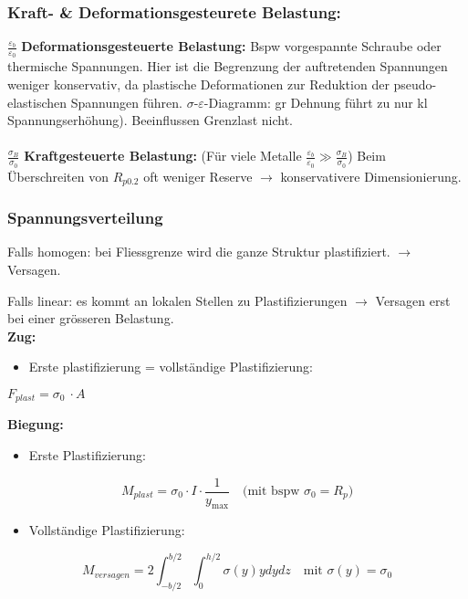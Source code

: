            \subsubsection{Kraft- \& Deformationsgesteurete Belastung:}
            $\frac{\varepsilon_b}{\varepsilon_0}$ \textbf{Deformationsgesteuerte Belastung:} Bspw vorgespannte Schraube oder thermische Spannungen. Hier ist die Begrenzung der auftretenden Spannungen weniger konservativ, da plastische Deformationen zur Reduktion der pseudo-elastischen Spannungen führen. $\sigma$-$\varepsilon$-Diagramm: gr Dehnung führt zu nur kl Spannungserhöhung). Beeinflussen Grenzlast nicht.\\\\ 
            $\frac{\sigma_B}{\sigma_0}$ \textbf{Kraftgesteuerte Belastung:} (Für viele Metalle $\frac{\varepsilon_b}{\varepsilon_0} \gg \frac{\sigma_B}{\sigma_0}$) Beim Überschreiten von $R_{p0.2}$ oft weniger Reserve $\rightarrow$ konservativere Dimensionierung.
        
        \subsubsection{Spannungsverteilung}
            Falls homogen: bei Fliessgrenze wird die ganze Struktur plastifiziert. $\rightarrow$ Versagen. 
              
            Falls linear: es kommt an lokalen Stellen zu Plastifizierungen $\rightarrow$ Versagen erst bei einer grösseren Belastung.\\
            \textbf{Zug:}
            \begin{itemize}
                \item Erste plastifizierung = vollständige Plastifizierung:
            \end{itemize}
            \begin{center}
                $\displaystyle F_{plast} = \sigma_0\ \cdot A$
            \end{center}
            
            \textbf{Biegung:}
            \begin{itemize}
                \item Erste Plastifizierung:
            \end{itemize}
            \[M_{plast} = \sigma_0\cdot I\cdot\frac{1}{y_{\textrm{max}}} \quad\textrm{(mit bspw $\sigma_0 = R_p$)}\]
            \begin{itemize}
                \item Vollständige Plastifizierung:
            \end{itemize}
            \[M_{versagen} = 2\int_{-b/2}^{b/2}\int_{0}^{h/2}\sigma(y)ydydz \quad\textrm{mit $\sigma(y) = \sigma_0$}\]
            
